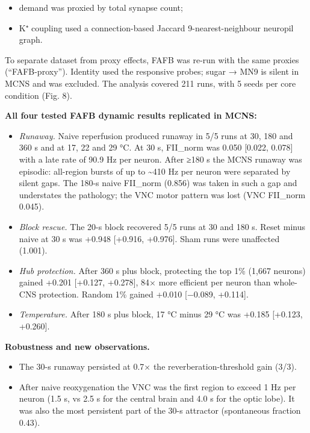 \documentclass[11pt]{article}
\providecommand{\tightlist}{\setlength{\itemsep}{0pt}\setlength{\parskip}{0pt}}
\begin{document}
\begin{itemize}
\tightlist
\item
  demand was proxied by total synapse count;
\item
  K⁺ coupling used a connection-based Jaccard 9-nearest-neighbour neuropil graph.
\end{itemize}

To separate dataset from proxy effects, FAFB was re-run with the same proxies (``FAFB-proxy''). Identity used the responsive probes; sugar → MN9 is silent in MCNS and was excluded. The analysis covered 211 runs, with 5 seeds per core condition (Fig. 8).

\textbf{All four tested FAFB dynamic results replicated in MCNS:}

\begin{itemize}
\tightlist
\item
  \emph{Runaway.} Naive reperfusion produced runaway in 5/5 runs at 30, 180 and 360 s and at 17, 22 and 29 °C. At 30 s, FII\_norm was 0.050 {[}0.022, 0.078{]} with a late rate of 90.9 Hz per neuron. After ≥180 s the MCNS runaway was episodic: all-region bursts of up to \textasciitilde410 Hz per neuron were separated by silent gaps. The 180-s naive FII\_norm (0.856) was taken in such a gap and understates the pathology; the VNC motor pattern was lost (VNC FII\_norm 0.045).
\item
  \emph{Block rescue.} The 20-s block recovered 5/5 runs at 30 and 180 s. Reset minus naive at 30 s was +0.948 {[}+0.916, +0.976{]}. Sham runs were unaffected (1.001).
\item
  \emph{Hub protection.} After 360 s plus block, protecting the top 1\% (1,667 neurons) gained +0.201 {[}+0.127, +0.278{]}, 84× more efficient per neuron than whole-CNS protection. Random 1\% gained +0.010 {[}−0.089, +0.114{]}.
\item
  \emph{Temperature.} After 180 s plus block, 17 °C minus 29 °C was +0.185 {[}+0.123, +0.260{]}.
\end{itemize}

\textbf{Robustness and new observations.}

\begin{itemize}
\tightlist
\item
  The 30-s runaway persisted at 0.7× the reverberation-threshold gain (3/3).
\item
  After naive reoxygenation the VNC was the first region to exceed 1 Hz per neuron (1.5 s, vs 2.5 s for the central brain and 4.0 s for the optic lobe). It was also the most persistent part of the 30-s attractor (spontaneous fraction 0.43).
\end{itemize}
\end{document}
